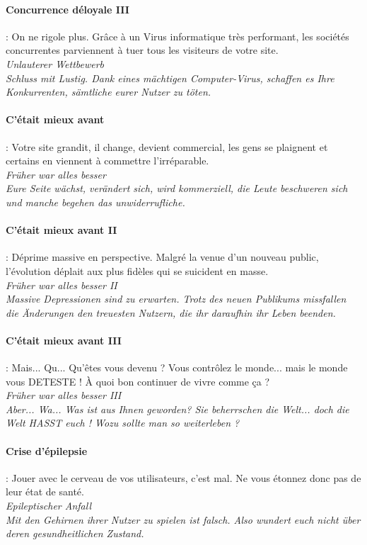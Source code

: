 \documentclass[10pt,a4paper]{article}
\begin{document}
\paragraph{Concurrence déloyale III} : On ne rigole plus. Grâce à un Virus informatique très performant, les sociétés concurrentes parviennent à tuer tous les visiteurs de votre site.\\
\textit{Unlauterer Wettbewerb}\\
\textit{Schluss mit Lustig. Dank eines mächtigen Computer-Virus, schaffen es Ihre Konkurrenten, sämtliche eurer Nutzer zu töten.}


\paragraph{C'était mieux avant} : Votre site grandit, il change, devient commercial, les gens se plaignent et certains en viennent à commettre l'irréparable.\\
\textit{Früher war alles besser}\\
\textit{Eure Seite wächst, verändert sich, wird kommerziell, die Leute beschweren sich und manche begehen das unwiderrufliche.}


\paragraph{C'était mieux avant II} : Déprime massive en perspective. Malgré la venue d'un nouveau public, l'évolution déplait aux plus fidèles qui se suicident en masse.\\
\textit{Früher war alles besser II}\\
\textit{Massive Depressionen sind zu erwarten. Trotz des neuen Publikums missfallen die Änderungen den treuesten Nutzern, die ihr daraufhin ihr Leben beenden.}


\paragraph{C'était mieux avant III} : Mais... Qu... Qu'êtes vous devenu ? Vous contrôlez le monde... mais le monde vous DETESTE ! À quoi bon continuer de vivre comme ça ?\\
\textit{Früher war alles besser III}\\
\textit{Aber... Wa... Was ist aus Ihnen geworden? Sie beherrschen die Welt... doch die Welt HASST euch ! Wozu sollte man so weiterleben ?}


\paragraph{Crise d’épilepsie} : Jouer avec le cerveau de vos utilisateurs, c'est mal. Ne vous étonnez donc pas de leur état de santé.\\
\textit{Epileptischer Anfall}\\
\textit{Mit den Gehirnen ihrer Nutzer zu spielen ist falsch. Also wundert euch nicht über deren gesundheitlichen Zustand.}
\end{document}
